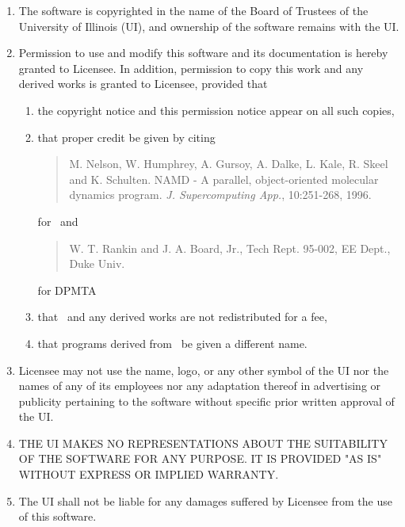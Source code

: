 \begin{enumerate}
\item The software is copyrighted in the name of the Board of Trustees
of the University of Illinois (UI), and ownership of the software
remains with the UI.

\item Permission to use and modify this software and its documentation
is hereby granted  to Licensee.  In addition,
permission to copy this work and any derived works is
granted to Licensee, provided that

\begin{enumerate}
\item the copyright notice and this permission notice appear on
all such copies, 
\item that proper credit be given by citing

\begin{quotation}
         \noindent M. Nelson, W. Humphrey, A. Gursoy, A. Dalke,
	 L. Kale, R. Skeel and K. Schulten.
	 NAMD - A parallel, object-oriented molecular dynamics program.
	 {\it J. Supercomputing App.}, 10:251-268, 1996.
\end{quotation}

\noindent for \NAMD\ and

\begin{quotation}
	 \noindent W. T. Rankin and J. A. Board, Jr., Tech Rept. 95-002,
	 EE Dept., Duke Univ.
\end{quotation}

\noindent for DPMTA
\item that \NAMD\ and any derived works are not redistributed for a fee,
\item that programs derived from \NAMD\ be given a different name.
\end{enumerate}

\item Licensee may not use the name, logo, or any other symbol of the UI
    nor the names of any of its employees nor any adaptation thereof in
    advertising or publicity pertaining to the software without specific
    prior written approval of the UI.

\item THE UI MAKES NO REPRESENTATIONS ABOUT THE SUITABILITY OF THE
    SOFTWARE FOR ANY PURPOSE.  IT IS PROVIDED "AS IS" WITHOUT EXPRESS
    OR IMPLIED WARRANTY.

\item The UI shall not be liable for any damages suffered by Licensee from
    the use of this software.
\end{enumerate}

